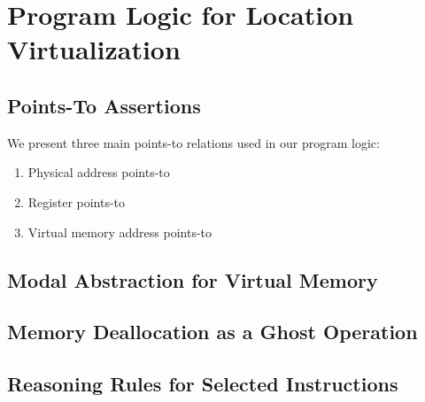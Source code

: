 \section{Program Logic for Location Virtualization}
\label{sec:logic}

\subsection{Points-To Assertions}
\label{sec:pointsto}
We present three main points-to relations used in our program logic:
\begin{enumerate}
\item Physical address points-to
\item Register points-to
\item Virtual memory address points-to
\end{enumerate}



\subsection{Modal Abstraction for Virtual Memory}
\label{sec:credits}

\subsection{Memory Deallocation as a Ghost Operation}
\label{sec:free}

\subsection{Reasoning Rules for Selected Instructions}
\label{sec:reasoning}



